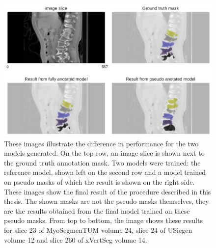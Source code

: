 \begin{figure}
\begin{minipage}{.99\textwidth}
    \end{minipage} 
    \vspace{2 mm}
    \begin{minipage}{.99\textwidth}
        \includegraphics[width=.99\textwidth]{images/fullvsPseudo_xVertSeg_014_260.pdf}
    \end{minipage}
    \caption{These images illustrate the difference in performance for the two models generated. On the top row, an image slice is shown next to the ground truth annotation mask.
    Two models were trained: the reference model, shown left on the second row and a model trained on pseudo masks of which the result is shown on the right side. 
    These images show the final result of the procedure described in this thesis. The shown masks are not the pseudo masks themselves, they are the results obtained from the final model trained on these pseudo masks.
    From top to bottom, the image shows these results for slice 23 of MyoSegmenTUM volume 24, slice 24 of USiegen volume 12 and slice 260 of xVertSeg volume 14. 
    \protect
    \label{fig:fullvsPseudo}}
\end{figure}

